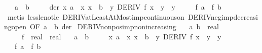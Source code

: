 \begin{isabellebody}
\ \ \ {\isachardoublequoteopen}a\ {\isacharless}{\kern0pt}\ b{\isachardoublequoteclose}\isanewline
\ \ \ \ \ der{\isacharcolon}{\kern0pt}\ {\isachardoublequoteopen}{\isasymAnd}x{\isachardot}{\kern0pt}\ {\isasymlbrakk}a\ {\isasymle}\ x{\isacharsemicolon}{\kern0pt}\ x\ {\isasymle}\ b{\isasymrbrakk}\ {\isasymLongrightarrow}\ {\isasymexists}y{\isachardot}{\kern0pt}\ DERIV\ f\ x\ {\isacharcolon}{\kern0pt}{\isachargreater}{\kern0pt}\ y\ {\isasymand}\ y\ {\isacharless}{\kern0pt}\ {}{\isachardoublequoteclose}\isanewline
\ \ \ {\isachardoublequoteopen}f\ a\ {\isachargreater}{\kern0pt}\ f\ b{\isachardoublequoteclose}\isanewline
%
\isadelimproof
\ \ %
\endisadelimproof
%
\isatagproof
{}\isamarkupfalse%
\ {\isacharparenleft}{\kern0pt}metis\ less{\isacharunderscore}{\kern0pt}le{\isacharunderscore}{\kern0pt}not{\isacharunderscore}{\kern0pt}le\ DERIV{\isacharunderscore}{\kern0pt}atLeastAtMost{\isacharunderscore}{\kern0pt}imp{\isacharunderscore}{\kern0pt}continuous{\isacharunderscore}{\kern0pt}on\ DERIV{\isacharunderscore}{\kern0pt}neg{\isacharunderscore}{\kern0pt}imp{\isacharunderscore}{\kern0pt}decreasing{\isacharunderscore}{\kern0pt}open\ {\isacharbrackleft}{\kern0pt}OF\ {\isacartoucheopen}a\ {\isacharless}{\kern0pt}\ b{\isacartoucheclose}{\isacharbrackright}{\kern0pt}\ der{\isacharparenright}{\kern0pt}%
\endisatagproof
{\isafoldproof}%
%
\isadelimproof
\isanewline
%
\endisadelimproof
\isanewline
{}\isamarkupfalse%
\ DERIV{\isacharunderscore}{\kern0pt}nonpos{\isacharunderscore}{\kern0pt}imp{\isacharunderscore}{\kern0pt}nonincreasing{\isacharcolon}{\kern0pt}\isanewline
\ \ \ a\ b\ {\isacharcolon}{\kern0pt}{\isacharcolon}{\kern0pt}\ real\isanewline
\ \ \ \ \ f\ {\isacharcolon}{\kern0pt}{\isacharcolon}{\kern0pt}\ {\isachardoublequoteopen}real\ {\isasymRightarrow}\ real{\isachardoublequoteclose}\isanewline
\ \ \ {\isachardoublequoteopen}a\ {\isasymle}\ b{\isachardoublequoteclose}\isanewline
\ \ \ \ \ {\isachardoublequoteopen}{\isasymAnd}x{\isachardot}{\kern0pt}\ {\isasymlbrakk}a\ {\isasymle}\ x{\isacharsemicolon}{\kern0pt}\ x\ {\isasymle}\ b{\isasymrbrakk}\ {\isasymLongrightarrow}\ {\isasymexists}y{\isachardot}{\kern0pt}\ DERIV\ f\ x\ {\isacharcolon}{\kern0pt}{\isachargreater}{\kern0pt}\ y\ {\isasymand}\ y\ {\isasymle}\ {}{\isachardoublequoteclose}\isanewline
\ \ \ {\isachardoublequoteopen}f\ a\ {\isasymge}\ f\ b{\isachardoublequoteclose}\isanewline
%
\isadelimproof
%
\endisadelimproof

\end{isabellebody}
